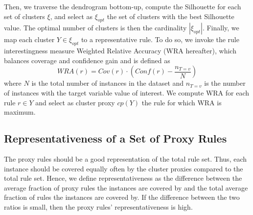 \documentclass[
  oneside]{book}
\begin{document}
Then, we traverse the dendrogram bottom-up, compute the Silhouette for each set of clusters \(\xi\), and select as \(\xi_{opt}\) the set of clusters with the best Silhouette value.
The optimal number of clusters is then the cardinality \(|\xi_{opt}|\).
Finally, we map each cluster \(Y\in\xi_{opt}\) to a representative rule.
To do so, we invoke the rule interestingness measure Weighted Relative Accuracy \autocite{lavravc1999rule} (WRA hereafter), which balances coverage and confidence gain and is defined as
\begin{equation}
WRA(r)=Cov(r)\cdot\left(Conf(r)-\frac{n_{T=v}}{N}\right)
\label{eq:wra}
\end{equation}
where \(N\) is the total number of instances in the dataset and \(n_{T=v}\) is the number of instances with the target variable value of interest.
We compute WRA for each rule \(r\in{Y}\) and select as cluster proxy \(cp(Y)\) the rule for which WRA is maximum.

\hypertarget{representativeness-of-a-set-of-proxy-rules}{%
\subsection{Representativeness of a Set of Proxy Rules}\label{representativeness-of-a-set-of-proxy-rules}}

The proxy rules should be a good representation of the total rule set.
Thus, each instance should be covered equally often by the cluster proxies compared to the total rule set.
Hence, we define representativeness as the difference between the average fraction of proxy rules the instances are covered by and the total average fraction of rules the instances are covered by.
If the difference between the two ratios is small, then the proxy rules' representativeness is high.
\end{document}
